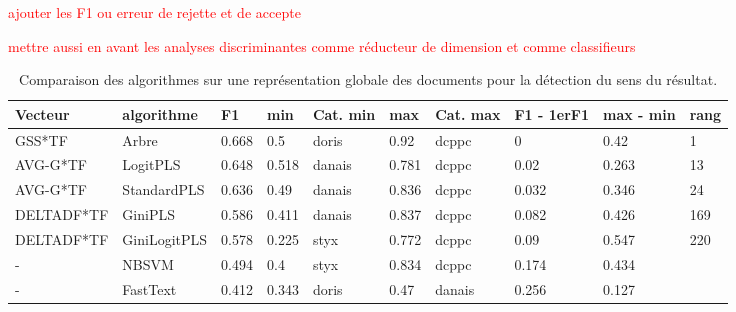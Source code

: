 \begin{table}[!htb]	
	\tiny
	
	\textcolor{red}{ajouter les F1 ou erreur de rejette et de accepte}
	
	\textcolor{red}{mettre aussi en avant les analyses discriminantes comme réducteur de dimension et comme classifieurs}
	
	\centering
	\begin{tabular}{|l|l|l|l|l|l|l|l|l|l|}
		\hline
		\textbf{Vecteur} & \textbf{algorithme} & \textbf{F1} & \textbf{min} & \textbf{Cat. min} & \textbf{max} & \textbf{Cat. max} & \textbf{F1 - 1erF1} & \textbf{max - min} & \textbf{rang} \\ \hline
		GSS*TF           & Arbre               & 0.668       & 0.5          & doris             & 0.92         & dcppc             & 0                   & 0.42               & 1             \\ \hline
		AVG-G*TF         & LogitPLS            & 0.648       & 0.518        & danais            & 0.781        & dcppc             & 0.02                & 0.263              & 13            \\ \hline
		AVG-G*TF         & StandardPLS         & 0.636       & 0.49         & danais            & 0.836        & dcppc             & 0.032               & 0.346              & 24            \\ \hline
		DELTADF*TF       & GiniPLS             & 0.586       & 0.411        & danais            & 0.837        & dcppc             & 0.082               & 0.426              & 169           \\ \hline
		DELTADF*TF       & GiniLogitPLS        & 0.578       & 0.225        & styx              & 0.772        & dcppc             & 0.09                & 0.547              & 220           \\ \hline
		-                & NBSVM               & 0.494       & 0.4          & styx              & 0.834        & dcppc             & 0.174               & 0.434              &               \\ \hline
		-                & FastText            & 0.412       & 0.343        & doris             & 0.47         & danais            & 0.256               & 0.127              &               \\ \hline
	\end{tabular}
\caption{Comparaison des algorithmes sur une représentation globale des documents pour la détection du sens du résultat.}\label{tab:sensrst:global}
\end{table}

